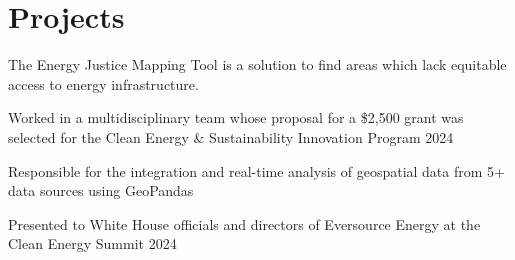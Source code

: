 \documentclass[]{resume-template}
\begin{document}
\begin{minipage}[t]{0.66\textwidth}
	\section{Projects}\label{sec:projects}
	\label{subsec:exo-eda}
	\begin{tightemize}
		\item The Energy Justice Mapping Tool is a solution to find areas which lack equitable access to energy infrastructure.
		\item Worked in a multidisciplinary team whose proposal for a \$2,500 grant was selected for the Clean Energy \& Sustainability Innovation Program 2024
		\item Responsible for the integration and real-time analysis of geospatial data from 5+ data sources using GeoPandas
		\item Presented to White House officials and directors of Eversource Energy at the Clean Energy Summit 2024
	\end{tightemize}

\end{minipage}
\end{document}
